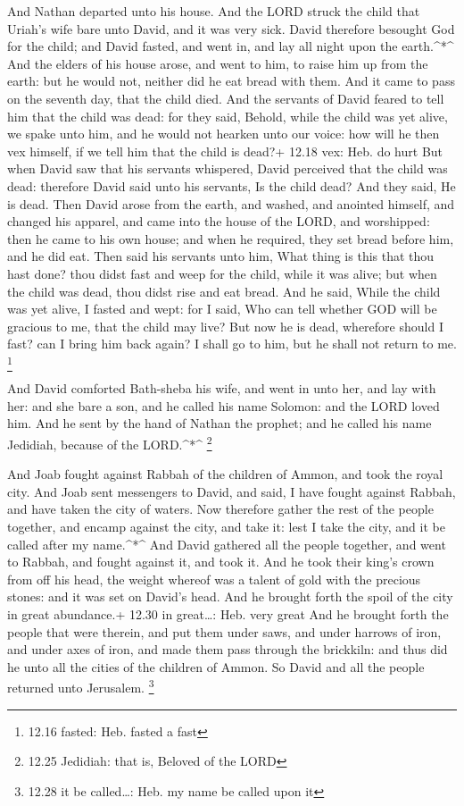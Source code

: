  And Nathan departed unto his house. And the LORD struck
the child that Uriah's wife bare unto David, and it was very sick.
 David therefore besought God for the child; and David
fasted, and went in, and lay all night upon the earth.\^{}*\^{}
 And the elders of his house arose, and went to him, to
raise him up from the earth: but he would not, neither did he eat bread
with them.  And it came to pass on the seventh day, that
the child died. And the servants of David feared to tell him that the
child was dead: for they said, Behold, while the child was yet alive, we
spake unto him, and he would not hearken unto our voice: how will he
then vex himself, if we tell him that the child is dead?+ 12.18 vex:
Heb. do hurt  But when David saw that his servants
whispered, David perceived that the child was dead: therefore David said
unto his servants, Is the child dead? And they said, He is dead.
 Then David arose from the earth, and washed, and anointed
himself, and changed his apparel, and came into the house of the LORD,
and worshipped: then he came to his own house; and when he required,
they set bread before him, and he did eat.  Then said his
servants unto him, What thing is this that thou hast done? thou didst
fast and weep for the child, while it was alive; but when the child was
dead, thou didst rise and eat bread.  And he said, While
the child was yet alive, I fasted and wept: for I said, Who can tell
whether GOD will be gracious to me, that the child may live?
 But now he is dead, wherefore should I fast? can I bring
him back again? I shall go to him, but he shall not return to me.
\footnote{12.16 fasted: Heb. fasted a fast}

 And David comforted Bath-sheba his wife, and went in unto
her, and lay with her: and she bare a son, and he called his name
Solomon: and the LORD loved him.  And he sent by the hand
of Nathan the prophet; and he called his name Jedidiah, because of the
LORD.\^{}*\^{} \footnote{12.25 Jedidiah: that is, Beloved of the LORD}

 And Joab fought against Rabbah of the children of Ammon,
and took the royal city.  And Joab sent messengers to
David, and said, I have fought against Rabbah, and have taken the city
of waters.  Now therefore gather the rest of the people
together, and encamp against the city, and take it: lest I take the
city, and it be called after my name.\^{}*\^{}  And David
gathered all the people together, and went to Rabbah, and fought against
it, and took it.  And he took their king's crown from off
his head, the weight whereof was a talent of gold with the precious
stones: and it was set on David's head. And he brought forth the spoil
of the city in great abundance.+ 12.30 in great\ldots: Heb. very great
 And he brought forth the people that were therein, and put
them under saws, and under harrows of iron, and under axes of iron, and
made them pass through the brickkiln: and thus did he unto all the
cities of the children of Ammon. So David and all the people returned
unto Jerusalem. \footnote{12.28 it be called\ldots: Heb. my name be
  called upon it}

